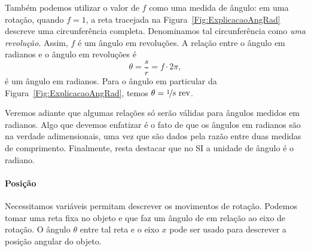 Também podemos utilizar o valor de $f$ como uma medida de ângulo: em uma rotação, quando $f = 1$, a reta tracejada na Figura~\ref{Fig:ExplicacaoAngRad} descreve uma circunferência completa. Denominamos tal circunferência como \emph{uma revolução}. Assim, $f$ é um ângulo em revoluções. A relação entre o ângulo em radianos e o ângulo em revoluções é
\begin{equation}
    \theta = \frac{s}{r} = f \cdot 2 \pi,
\end{equation}
%
é um ângulo em radianos. Para o ângulo em particular da Figura~\ref{Fig:ExplicacaoAngRad}, temos $\theta = \nicefrac{1}{8}~\rm{rev}$.

Veremos adiante que algumas relações só serão válidas para ângulos medidos em radianos. Algo que devemos enfatizar é o fato de que os ângulos em radianos são na verdade adimensionais, uma vez que são dados pela razão entre duas medidas de comprimento. Finalmente, resta destacar que no SI a unidade de ângulo é o radiano.


\paragraph{Posição}

Necessitamos variáveis permitam descrever os movimentos de rotação. Podemos tomar uma reta fixa no objeto e que faz um ângulo de  em relação ao eixo de rotação. O ângulo $\theta$ entre tal reta e o eixo $x$ pode ser usado para descrever a posição angular do objeto.


